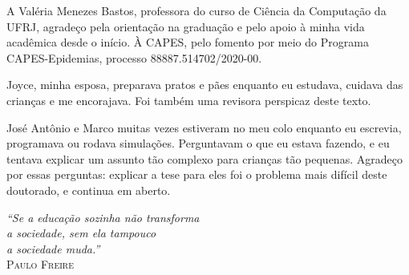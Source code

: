 \documentclass[12pt,a4paper,openany]{book}
\begin{document}
A Valéria Menezes Bastos, professora do curso de Ciência da Computação da
UFRJ, agradeço pela orientação na graduação e pelo apoio à minha vida
acadêmica desde o início. À CAPES, pelo fomento por meio do Programa
CAPES-Epidemias, processo 88887.514702/2020-00.

Joyce, minha esposa, preparava pratos e pães enquanto eu estudava, cuidava
das crianças e me encorajava. Foi também uma revisora perspicaz deste
texto.

José Antônio e Marco muitas vezes estiveram no meu colo enquanto eu
escrevia, programava ou rodava simulações. Perguntavam o que eu estava
fazendo, e eu tentava explicar um assunto tão complexo para crianças tão
pequenas. Agradeço por essas perguntas: explicar a tese para eles foi o
problema mais difícil deste doutorado, e continua em aberto.






\newpage

\thispagestyle{empty}

\vspace*{\fill}

\begin{flushright}
\textit{``Se a educação sozinha não transforma\\
a sociedade, sem ela tampouco\\
a sociedade muda.''}\\[6pt]
\textsc{Paulo Freire}
\end{flushright}





\newpage

\noindent
\end{document}
